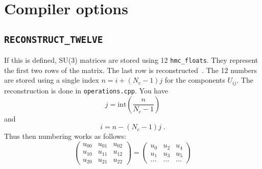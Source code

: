 \section{Compiler options}
\subsection{\texttt{RECONSTRUCT\_TWELVE}}
If this is defined, SU(3) matrices are stored using 12 \texttt{hmc\_floats}. They represent the first two rows of the matrix. The last row is reconstructed~\cite{Clark:2009wm}. The 12 numbers are stored using a single index $n=i+(N_c-1)j$ for the components $U_{ij}$. The reconstruction is done in \texttt{operations.cpp}. You have 
\[ j = \text{int} \left(\frac{n}{N_c-1}\right) \]
and
\[ i = n - (N_c-1)j\;. \]
Thus then numbering works as follows:
\[ \left(\begin{array}{rrr} u_{00} & u_{01} & u_{02} \\ u_{10} & u_{11} & u_{12} \\ u_{20} & u_{21} & u_{22}\end{array}\right)
=
\left(\begin{array}{rrr} u_{0} & u_{2} & u_{4} \\ u_{1} & u_{3} & u_{5} \\ \ldots & \ldots & \ldots \end{array}\right)
\]